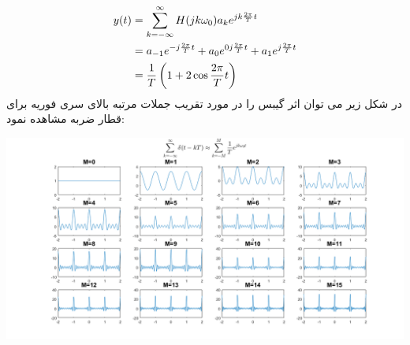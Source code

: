 \documentclass[50pt]{article}
\begin{document}
\begin{RTL}
{\[\begin{split}
y(t)&=\sum_{k=-\infty}^{\infty} H(jk\omega_0)a_ke^{jk{2\pi\over T}t}
\\&=a_{-1}e^{-j{2\pi\over T}t}+a_{0}e^{0j{2\pi\over T}t}+a_{1}e^{j{2\pi\over T}t}
\\&={1\over T}\left(1+2\cos {2\pi\over T}t\right)
\end{split}
\] 
در شکل زیر می توان اثر گیبس را در مورد تقریب جملات مرتبه بالای سری فوریه برای قطار ضربه مشاهده نمود:
\begin{center}
\includegraphics[width=170mm]{m9.png}
\end{center}













}





\end{RTL}
\end{document}
